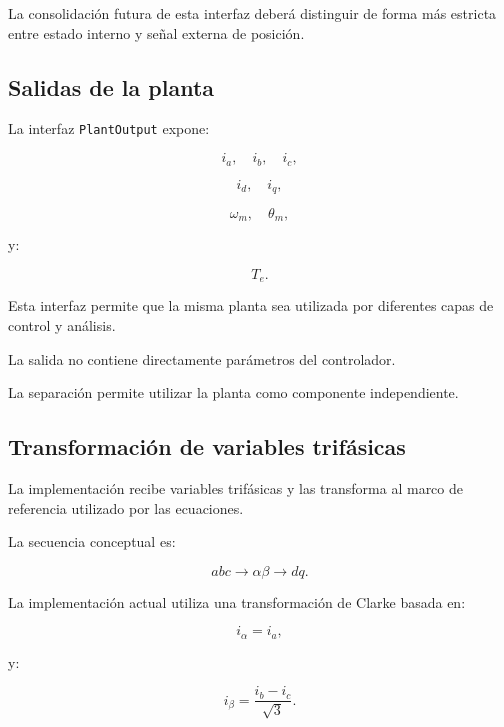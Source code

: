 La consolidación futura de esta interfaz deberá distinguir de forma más estricta entre estado interno y señal externa de posición.

\subsection{Salidas de la planta}

La interfaz \texttt{PlantOutput} expone:

\begin{equation}
i_a,\quad i_b,\quad i_c,
\end{equation}

\begin{equation}
i_d,\quad i_q,
\end{equation}

\begin{equation}
\omega_m,\quad \theta_m,
\end{equation}

y:

\begin{equation}
T_e.
\end{equation}

Esta interfaz permite que la misma planta sea utilizada por diferentes capas de control y análisis.

La salida no contiene directamente parámetros del controlador.

La separación permite utilizar la planta como componente independiente.

\subsection{Transformación de variables trifásicas}

La implementación recibe variables trifásicas y las transforma al marco de referencia utilizado por las ecuaciones.

La secuencia conceptual es:

\begin{equation}
abc
\rightarrow
\alpha\beta
\rightarrow
dq.
\end{equation}

La implementación actual utiliza una transformación de Clarke basada en:

\begin{equation}
i_\alpha=i_a,
\end{equation}

y:

\begin{equation}
i_\beta=
\frac{i_b-i_c}{\sqrt{3}}.
\end{equation}

